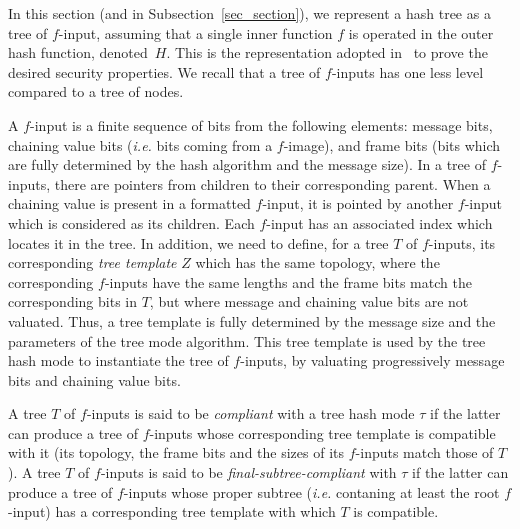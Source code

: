 \documentclass{llncs}
\begin{document}
In this section (and in Subsection~\ref{sec_section}), we represent a hash tree as a tree of $f$-input,
assuming that a single inner function $f$ is operated in the outer hash function, denoted~$H$.
This is the representation adopted in~\cite{BDPV09,BDPV14_Suf} to prove the desired security properties.
We recall that a tree of $f$-inputs has one less level compared to a tree of nodes. 

A $f$-input is a finite 
sequence of bits from the following elements: message bits, chaining value bits (\emph{i.e.} bits coming from a $f$-image), and frame bits
(bits which are fully determined by the hash algorithm and the message size). In a tree of $f$-inputs, there are pointers from children to their corresponding parent. 
When a chaining value is present in a formatted $f$-input, it is
pointed by another $f$-input which is considered as its children. Each $f$-input has an associated index which locates it in the tree.
In addition, we need to define, for a tree $T$ of $f$-inputs, its corresponding \emph{tree template} $Z$ which has the same topology, where the corresponding $f$-inputs
have the same lengths and the frame bits match the corresponding bits in $T$, but where message and chaining value bits are not valuated. 
Thus, a tree template is fully determined by the message size 
and the parameters of the tree mode algorithm. This tree template
is used by the tree hash mode to instantiate the tree of $f$-inputs, by valuating progressively message bits and chaining value bits.


A tree $T$ of $f$-inputs is said to be \emph{compliant} with a tree hash mode $\tau$ if the latter can produce a tree of $f$-inputs whose corresponding tree template
is compatible with it (its topology, the frame bits and the sizes of its $f$-inputs match those of $T$). A tree $T$ of $f$-inputs is said to be 
\emph{final-subtree-compliant} with $\tau$ if the latter can produce a tree of $f$-inputs whose proper subtree (\textit{i.e.} contaning at least the root $f$-input) 
has a corresponding tree template with which $T$ is compatible.
\end{document}
